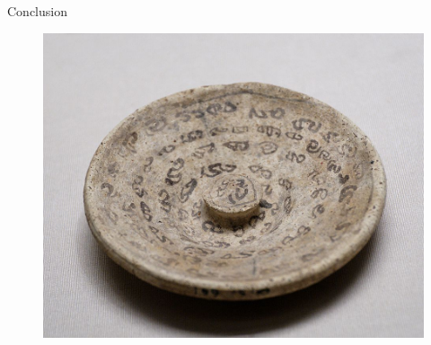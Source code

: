 \begin{frame}{Conclusion}
  \begin{figure}
    \includegraphics[scale=0.82]{magic_lid.jpg}
  \end{figure}
\end{frame}



